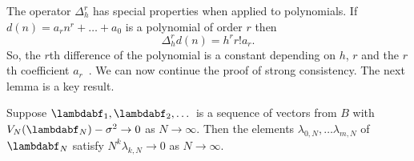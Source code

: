 \documentclass[journal]{IEEEtran}
\begin{document}
The operator $\Delta_h^r$ has special properties when applied to polynomials. If $d(n) = a_r n^r + \dots + a_0$ is a polynomial of order $r$ then
 \begin{equation} \label{eq:mfinitediffpoly}
 \Delta_h^r d(n) = h^r r! a_r. 
 \end{equation}
So, the $r$th difference of the polynomial is a constant depending on $h$, $r$ and the $r$th coefficient $a_r$~\cite[page 51]{Jordan_Calculus_of_finite_difference_1965}.  We can now continue the proof of strong consistency.  The next lemma is a key result.

\begin{lemma}\label{lem:moran2}
Suppose $\lambdabf_1, \lambdabf_2,\dots$ is a sequence of vectors from $B$ with $V_N(\lambdabf_N) - \sigma^2\rightarrow 0$ as $N\rightarrow\infty$. Then the elements $\lambda_{0,N}, \dots \lambda_{m,N}$ of $\lambdabf_N$ satisfy $N^k\lambda_{k, N}\rightarrow0$ as $N\rightarrow\infty$.
\end{lemma}
\end{document}
